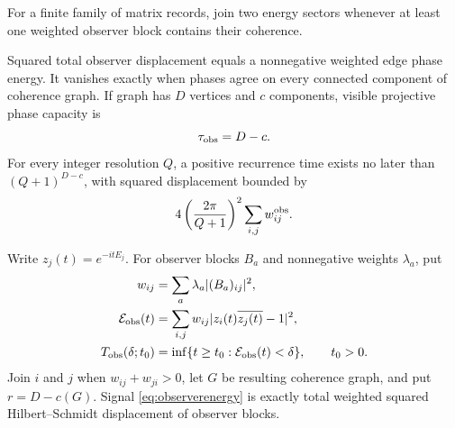 For a finite family of matrix records, join two energy sectors whenever at
least one weighted observer block contains their coherence.

\begin{theorem}
\label{thm:observer}
Squared total observer displacement equals a nonnegative weighted edge phase
energy.  It vanishes exactly when phases agree on every connected component
of coherence graph.  If graph has $D$ vertices and $c$ components, visible
projective phase capacity is
\begin{equation}
 \tau_{\rm obs}=D-c.                                  \label{eq:observerrank}
\end{equation}
For every integer resolution $Q$, a positive recurrence time exists no later
than $(Q+1)^{D-c}$, with squared displacement bounded by
\begin{equation}
 4\left(\frac{2\pi}{Q+1}\right)^2
 \sum_{i,j}w^{\rm obs}_{ij}.                          \label{eq:observerdeadline}
\end{equation}
\end{theorem}

Write $z_j(t)=e^{-itE_j}$.  For observer blocks $B_a$ and nonnegative weights
$\lambda_a$, put
\begin{align}
 w_{ij}&=\sum_a\lambda_a |(B_a)_{ij}|^2,\nonumber\\
 \mathcal E_{\rm obs}(t)
   &=\sum_{i,j}w_{ij}|z_i(t)\overline{z_j(t)}-1|^2,\label{eq:observerenergy}\\
 T_{\rm obs}(\delta;t_0)
   &=\inf\{t\ge t_0:\mathcal E_{\rm obs}(t)<\delta\},
   \qquad t_0>0.                                      \label{eq:observerreturntime}
\end{align}
Join $i$ and $j$ when $w_{ij}+w_{ji}>0$, let $G$ be resulting coherence
graph, and put $r=D-c(G)$.  Signal \eqref{eq:observerenergy} is exactly total
weighted squared Hilbert--Schmidt displacement of observer blocks.


